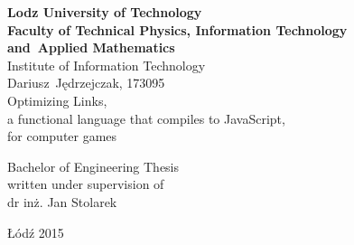 \begin{titlepage}
\begin{center}
\textbf{{\large Lodz University of Technology}\\}
\vspace{\medskipamount}
\textbf{\large Faculty of Technical Physics, Information Technology\\and~Applied Mathematics}
\vspace{\medskipamount}\\
{\large Institute of Information Technology}\\
\vspace{2.5cm}
{\Large {Dariusz~Jędrzejczak, 173095\\}}
\vspace{2cm}
{\huge{ {Optimizing Links,\\a functional language that compiles to JavaScript,\\for computer games}}}
\end{center}
\vspace{3cm}
\hfill
\begin{minipage}{.55\columnwidth}
{Bachelor of Engineering} Thesis\\
written under supervision of\\
dr inż. Jan Stolarek
\end{minipage}
\vfill
\begin{center}
Łódź {2015}
\end{center}
\end{titlepage}
